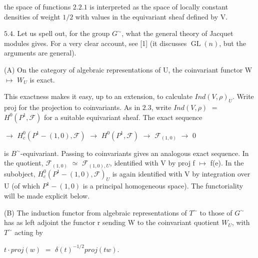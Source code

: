 \documentclass[10pt,a4paper]{article}
\begin{document}
\clearpage
{}
\label{d035-physical-022}
\par the space of functions $2.2.1$ is interpreted as the space of locally constant densities of weight $1/2$ with values in the equivariant sheaf defined by V.\par
\par $5.4$. Let us spell out, for the group $G^\sim$, what the general theory of Jacquet modules gives. For a very clear account, see [1] (it discusses $\operatorname{GL}(n)$, but the arguments are general).\par
\par (A) On the category of algebraic representations of U, the coinvariant functor W $\mapsto{}$ $W_U$ is exact.\par
\par This exactness makes it easy, up to an extension, to calculate $Ind(V,\rho{})_U$. Write proj for the projection to coinvariants. As in $2.3$, write $Ind(V,\rho{})$ $=$ $H^0(P^1,\mathcal{F})$ for a suitable equivariant sheaf. The exact sequence\par
\par\smallskip\begin{center}\begin{minipage}{0.96\textwidth} $\to{}$ $H_c^0(P^1-{(1,0)},\mathcal{F})$ $\to{}$ $H^0(P^1,\mathcal{F})$ $\to{}$ $\mathcal{F}_{(1,0)}$ $\to{}$ 0
\end{minipage}\end{center}\smallskip
\par is $B^\sim$-equivariant. Passing to coinvariants gives an analogous exact sequence. In the quotient, $\mathcal{F}_{(1,0)}$ $\simeq{}$ $\mathcal{F}_{(1,0),U}$, identified with V by proj f $\mapsto{}$ f(e). In the subobject, $H_c^0(P^1-{(1,0)},\mathcal{F})_U$ is again identified with V by integration over U (of which $P^1-{(1,0)}$ is a principal homogeneous space). The functoriality will be made explicit below.\par
\par (B) The induction functor from algebraic representations of $T^\sim$ to those of $G^\sim$ has as left adjoint the functor r sending W to the coinvariant quotient $W_U$, with $T^\sim$ acting by\par
\par\smallskip\begin{center}\begin{minipage}{0.96\textwidth}\centering
$t\cdot{}proj(w)$ $=$ $\delta{}(t)^{-1/2}proj(tw)$.
\end{minipage}\end{center}\smallskip
\end{document}
